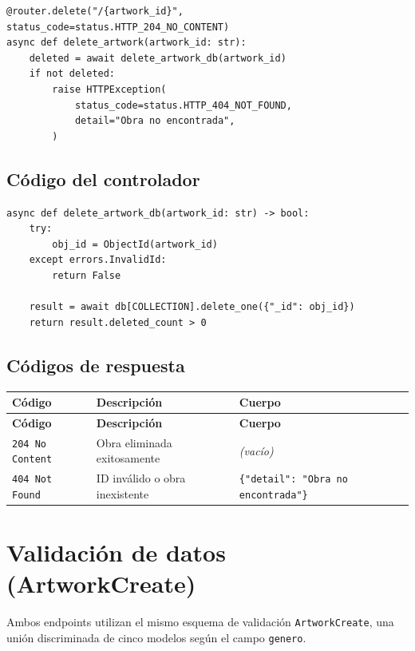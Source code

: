 \documentclass[12pt,a4paper]{article}
\begin{document}
\begin{lstlisting}
@router.delete("/{artwork_id}", status_code=status.HTTP_204_NO_CONTENT)
async def delete_artwork(artwork_id: str):
    deleted = await delete_artwork_db(artwork_id)
    if not deleted:
        raise HTTPException(
            status_code=status.HTTP_404_NOT_FOUND,
            detail="Obra no encontrada",
        )
\end{lstlisting}

\subsection{Código del controlador}

\begin{lstlisting}
async def delete_artwork_db(artwork_id: str) -> bool:
    try:
        obj_id = ObjectId(artwork_id)
    except errors.InvalidId:
        return False

    result = await db[COLLECTION].delete_one({"_id": obj_id})
    return result.deleted_count > 0
\end{lstlisting}

\subsection{Códigos de respuesta}

\begin{longtable}{lll}
\toprule
\textbf{Código} & \textbf{Descripción} & \textbf{Cuerpo} \\
\midrule
\endfirsthead
\toprule
\textbf{Código} & \textbf{Descripción} & \textbf{Cuerpo} \\
\midrule
\endhead
\bottomrule
\endfoot
\texttt{204 No Content} & Obra eliminada exitosamente & \emph{(vacío)} \\
\texttt{404 Not Found} & ID inválido o obra inexistente & \texttt{\{"detail": "Obra no encontrada"\}} \\
\bottomrule
\end{longtable}

\section{Validación de datos (ArtworkCreate)}

Ambos endpoints utilizan el mismo esquema de validación \texttt{ArtworkCreate},
una unión discriminada de cinco modelos según el campo \texttt{genero}.
\end{document}
